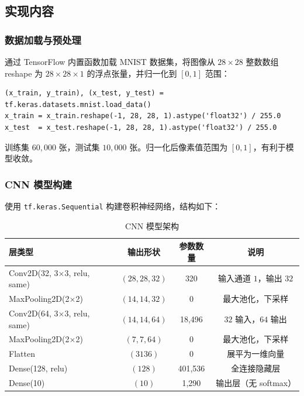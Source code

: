 \documentclass[UTF8]{ctexart}
\begin{document}
\subsection{实现内容}

\subsubsection{数据加载与预处理}

通过 TensorFlow 内置函数加载 MNIST 数据集，将图像从 $28 \times 28$ 整数数组 reshape 为 $28 \times 28 \times 1$ 的浮点张量，并归一化到 $[0, 1]$ 范围：

\begin{lstlisting}[caption={数据加载与预处理}]
(x_train, y_train), (x_test, y_test) = tf.keras.datasets.mnist.load_data()
x_train = x_train.reshape(-1, 28, 28, 1).astype('float32') / 255.0
x_test  = x_test.reshape(-1, 28, 28, 1).astype('float32') / 255.0
\end{lstlisting}

训练集 $60{,}000$ 张，测试集 $10{,}000$ 张。归一化后像素值范围为 $[0, 1]$，有利于模型收敛。

\subsubsection{CNN 模型构建}

使用 \texttt{tf.keras.Sequential} 构建卷积神经网络，结构如下：

\begin{table}[htbp]
\centering
\caption{CNN 模型架构}
\begin{tabular}{lccc}
\toprule
层类型 & 输出形状 & 参数数量 & 说明 \\
\midrule
Conv2D(32, 3$\times$3, relu, same) & $(28,28,32)$ & 320 & 输入通道 $1$，输出 $32$ \\
MaxPooling2D(2$\times$2) & $(14,14,32)$ & 0 & 最大池化，下采样 \\
Conv2D(64, 3$\times$3, relu, same) & $(14,14,64)$ & 18,496 & $32$ 输入，$64$ 输出 \\
MaxPooling2D(2$\times$2) & $(7,7,64)$ & 0 & 最大池化，下采样 \\
Flatten & $(3136)$ & 0 & 展平为一维向量 \\
Dense(128, relu) & $(128)$ & 401,536 & 全连接隐藏层 \\
Dense(10) & $(10)$ & 1,290 & 输出层（无 softmax） \\
\bottomrule
\end{tabular}
\end{table}
\end{document}
